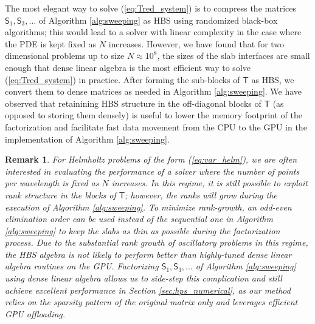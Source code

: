 \documentclass[11pt]{amsart}
\newtheorem{remark}{Remark}%
\newcommand{\mtx}[1]{\bm{\mathsf{#1}}}
\begin{document}
The most elegant way to solve (\ref{eq:Tred_system}) is
to compress the matrices $\mtx S_1, \mtx S_3, \dots$ of Algorithm \ref{alg:sweeping} as HBS using
randomized black-box algorithms; this would lead to a solver with linear complexity in the
case where the PDE is kept fixed as $N$ increases.
However, we have found that for two dimensional problems up to size $N \approx 10^8$, 
the sizes of the slab interfaces are small enough that 
dense linear algebra is the most efficient
way to solve (\ref{eq:Tred_system}) in practice. 
After forming the sub-blocks of $\mtx T$ as HBS, we convert them to dense matrices
as needed in Algorithm \ref{alg:sweeping}. We have observed that
retainining HBS structure in the off-diagonal blocks of $\mtx T$ (as opposed to storing them densely)
is useful to lower the memory footprint of the factorization 
and facilitate fast data movement from the CPU to the GPU in the implementation of  Algorithm \ref{alg:sweeping}.

\vspace{0.5em}

\begin{remark} \label{remark:helm_hbs}
For Helmholtz problems of the form (\ref{eq:var_helm}), we are often interested in evaluating the
performance of a solver where the number of points per wavelength is fixed
as $N$ increases. In this regime, it is still possible to exploit rank structure
in the blocks of $\mtx{T}$; however, the ranks will grow during the execution of 
Algorithm \ref{alg:sweeping}.
To minimize rank-growth, an odd-even elimination order can
be used instead of the sequential one in Algorithm \ref{alg:sweeping}
to keep the slabs as thin as possible during the factorization process.
Due to the substantial rank growth of oscillatory problems in this regime, the HBS algebra
is not likely to perform better than highly-tuned dense linear algebra
routines on the GPU.
Factorizing $\mtx S_1, \mtx S_3, \dots$ of Algorithm \ref{alg:sweeping} using dense linear algebra
allows us to side-step this complication and still achieve excellent performance in Section \ref{sec:hps_numerical},
as our method
relies on the sparsity pattern of the original matrix only and leverages efficient GPU offloading.
\end{remark}


\end{document}
